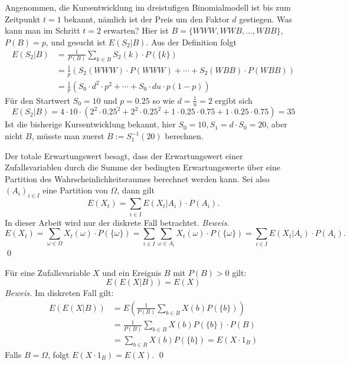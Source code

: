 \begin{bsp}[Rechenbeispiel]
Angenommen, die Kursentwicklung im dreistufigen Binomialmodell ist bis zum 
Zeitpunkt $t=1$ bekannt, nämlich ist der Preis um den Faktor $d$ gestiegen. 
Was kann man im Schritt $t=2$ erwarten? Hier ist $B=\{WWW, WWB, \dots, WBB \}$, $P(B)=p$, und gesucht ist $E(S_2|B)$. Aus der Definition folgt
$$
\begin{aligned}
E(S_2|B) &= \frac{1}{P(B)}\sum_{k \in B} S_2(k) \cdot P(\{ k \}) \\ &=\frac{1}{p}(S_2(WWW) \cdot P(WWW)+ \cdots + S_2(WBB) \cdot P(WBB)) \\
&= \frac{1}{p} (S_0 \cdot d^2 \cdot  p^2 + \cdots + S_0 \cdot d u \cdot p (1-p))
\end{aligned}
$$
Für den Startwert $S_0=10$ und $p=0.25$ so wie $d=\frac{1}{u}=2$ ergibt sich
$$E(S_2|B)=4 \cdot 10 \cdot \left( 2^2 \cdot 0.25^2 + 2^2 \cdot 0.25^2 + 1 \cdot 0.25\cdot 0.75 + 1 \cdot 0.25\cdot 0.75 \right)=35$$
Ist die bisherige Kursentwicklung bekannt, hier $S_0=10, S_1 = d \cdot S_0=20$, aber nicht $B$, müsste man zuerst $B:=S_1^{-1}(20)$ berechnen.
\end{bsp}

\begin{satz}
Der totale Erwartungswert besagt, dass der Erwartungswert einer Zufallsvariablen
durch die Summe der bedingten Erwartungswerte über eine Partition des Wahrscheinlichkeitsraumes
berechnet werden kann. Sei also $(A_i)_{i \in I}$ eine Partition von $\Omega$,
dann gilt $$E(X_t) = \sum_{i \in I} E(X_t|A_i) \cdot P(A_i).$$
In dieser Arbeit wird nur der diskrete Fall betrachtet. \textit{Beweis.}
$$E(X_t) = \sum_{\omega \in \Omega} X_t(\omega) \cdot P(\{\omega\}) = \sum_{i \in I} \sum_{\omega \in A_i} X_t(\omega) \cdot P(\{\omega\}) = \sum_{i \in I} E(X_t|A_i) \cdot P(A_i).$$
\qed

\end{satz}

\begin{satz}
Für eine Zufallsvariable $X$ und ein Ereignis $B$ mit $P(B) > 0$ gilt:
$$
E(E(X|B)) = E(X)
$$
\textit{Beweis.} Im diskreten Fall gilt:
$$
\begin{aligned}
E(E(X|B)) &= E\left(\frac{1}{P(B)} \sum_{b \in B} X(b) P(\{b\})\right) 
\\ &= \frac{1}{P(B)} \sum_{b \in B} X(b) P(\{b\}) \cdot P(B) 
\\ &= \sum_{b \in B} X(b) P(\{b\}) = E(X \cdot 1_B)
\end{aligned}
$$
Falls $B = \Omega$, folgt $E(X \cdot 1_B) = E(X)$. \qed
\end{satz}

